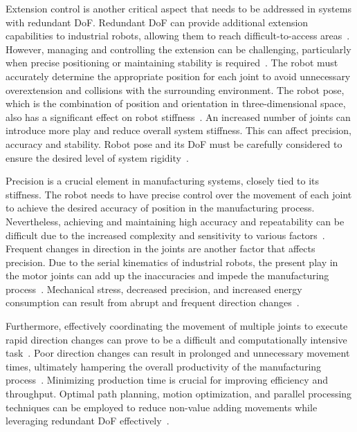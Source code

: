 Extension control is another critical aspect that needs to be addressed in systems with redundant DoF. Redundant DoF can provide additional extension capabilities to industrial robots, allowing them to reach difficult-to-access areas~\cite{Duong.2021}. However, managing and controlling the extension can be challenging, particularly when precise positioning or maintaining stability is required~\cite{Lin.2022}.
The robot must accurately determine the appropriate position for each joint to avoid unnecessary overextension and collisions with the surrounding environment. The robot pose, which is the combination of position and orientation in three-dimensional space, also has a significant effect on robot stiffness~\cite{Xiong.2019}. An increased number of joints can introduce more play and reduce overall system stiffness. This can affect precision, accuracy and stability. Robot pose and its DoF must be carefully considered to ensure the desired level of system rigidity~\cite{Liu.2022, Shi.2021}.


Precision is a crucial element in manufacturing systems, closely tied to its stiffness. The robot needs to have precise control over the movement of each joint to achieve the desired accuracy of position in the manufacturing process. Nevertheless, achieving and maintaining high accuracy and repeatability can be difficult due to the increased complexity and sensitivity to various factors~\cite{Duong.2021}. %
Frequent changes in direction in the joints are another factor that affects precision. 
Due to the serial kinematics of industrial robots, the present play in the motor joints can add up the inaccuracies and impede the manufacturing process~\cite{Huynh.2020, ChenGang.2014}. Mechanical stress, decreased precision, and increased energy consumption can result from abrupt and frequent direction changes~\cite{Gasparetto.2010}.
 
Furthermore, effectively coordinating the movement of multiple joints to execute rapid direction changes can prove to be a difficult and computationally intensive task~\cite{VandeWeghe.2007}. Poor direction changes can result in prolonged and unnecessary movement times, ultimately hampering the overall productivity of the manufacturing process~\cite{Reiter.2016}. %
Minimizing production time is crucial for improving efficiency and throughput. Optimal path planning, motion optimization, and parallel processing techniques can be employed to reduce non-value adding movements while leveraging redundant DoF effectively~\cite{Boscariol.2020}.




